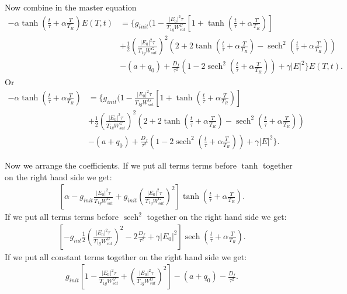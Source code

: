 \documentclass[preprint,secnumarabic,amssymb, nobibnotes, aip, prd]{revtex4-1}
\DeclareMathOperator{\sech}{sech}
\begin{document}
Now combine in the master equation 
\begin{align}
\label{eq:master-equation2}
 -\alpha \tanh(\frac{t}{\tau}+\alpha \frac{T}{T_R}) E(T,t) &=  \{ g_{init}(1 - \frac{|E_0|^2\tau}{T_{1g}W_{sat}^G} [1+\tanh(\frac{t}{\tau}+\alpha \frac{T}{T_R})]  \nonumber \\
 &  +\frac{1}{2} \left(\frac{|E_0|^2\tau}{T_{1g}W_{sat}^G}\right)^2 \left(2+2\tanh(\frac{t}{\tau}+\alpha \frac{T}{T_R}) - \sech^2(\frac{t}{\tau}+\alpha \frac{T}{T_R})\right)  \nonumber \\
 &  -(a+q_0)  + \frac{D_f}{\tau^2}\left( 1-2\sech^2(\frac{t}{\tau}+\alpha \frac{T}{T_R}) \right) + \gamma |E|^2  \}E(T,t).
\end{align}
Or 
\begin{align}
\label{eq:master-equation3}
-\alpha \tanh(\frac{t}{\tau}+\alpha \frac{T}{T_R}) &=  \{ g_{init}(1 - \frac{|E_0|^2\tau}{T_{1g}W_{sat}^G} [1+\tanh(\frac{t}{\tau}+\alpha \frac{T}{T_R})]  \nonumber \\
&  +\frac{1}{2} \left(\frac{|E_0|^2\tau}{T_{1g}W_{sat}^G}\right)^2 \left(2+2\tanh(\frac{t}{\tau}+\alpha \frac{T}{T_R}) - \sech^2(\frac{t}{\tau}+\alpha \frac{T}{T_R})\right)  \nonumber \\
&  -(a+q_0)  + \frac{D_f}{\tau^2}\left( 1-2\sech^2(\frac{t}{\tau}+\alpha \frac{T}{T_R}) \right) + \gamma |E|^2  \}.
\end{align}

Now we arrange the coefficients. If we put all terms terms before $\tanh $ together on the right hand side we get:
\begin{align}
\label{eq:coefs1}
\left[\alpha -g_{init}\frac{|E_0|^2\tau}{T_{1g}W_{sat}^G} +g_{init}\left(\frac{|E_0|^2\tau}{T_{1g}W_{sat}^G}\right)^2 \right]\tanh(\frac{t}{\tau}+\alpha \frac{T}{T_R}).
\end{align}
If we put all terms terms before $\sech^2 $ together on the right hand side we get:
\begin{align}
\label{eq:coefs2}
\left[ -g_{int}\frac{1}{2}\left(\frac{|E_0|^2\tau}{T_{1g}W_{sat}^G}\right)^2 - 2\frac{D_f}{\tau^2} +\gamma|E_0|^2\right]\sech(\frac{t}{\tau}+\alpha \frac{T}{T_R}).
\end{align}
If we put all constant terms together on the right hand side we get:
\begin{align}
\label{eq:coefs3}
g_{init}\left[1-\frac{|E_0|^2\tau}{T_{1g}W_{sat}^G}+\left(\frac{|E_0|^2\tau}{T_{1g}W_{sat}^G}\right)^2 \right] -(a+q_0) - \frac{D_f}{\tau^2}.
\end{align}
\end{document}
